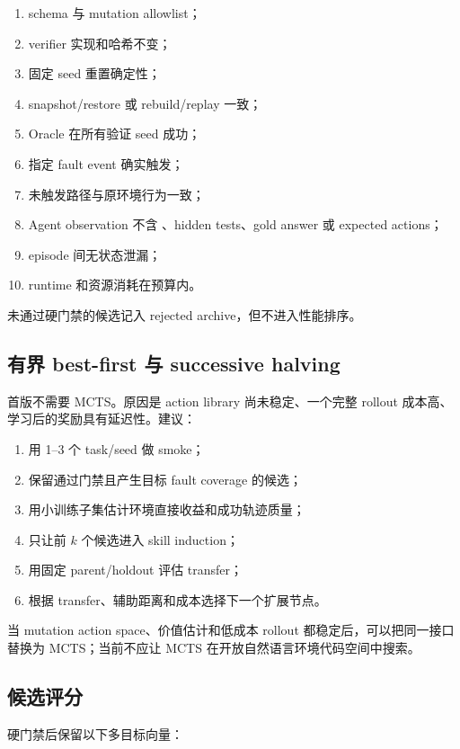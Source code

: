 \documentclass[11pt,a4paper,fontset=fandol]{ctexart}
\newcommand{\code}[1]{\texttt{\detokenize{#1}}}
\begin{document}
\begin{enumerate}
  \item schema 与 mutation allowlist；
  \item verifier 实现和哈希不变；
  \item 固定 seed 重置确定性；
  \item snapshot/restore 或 rebuild/replay 一致；
  \item Oracle 在所有验证 seed 成功；
  \item 指定 fault event 确实触发；
  \item 未触发路径与原环境行为一致；
  \item Agent observation 不含 \code{info}、hidden tests、gold answer 或 expected actions；
  \item episode 间无状态泄漏；
  \item runtime 和资源消耗在预算内。
\end{enumerate}

未通过硬门禁的候选记入 rejected archive，但不进入性能排序。

\subsection{有界 best-first 与 successive halving}

首版不需要 MCTS。原因是 action library 尚未稳定、一个完整 rollout 成本高、学习后的奖励具有延迟性。建议：

\begin{enumerate}
  \item 用 1--3 个 task/seed 做 smoke；
  \item 保留通过门禁且产生目标 fault coverage 的候选；
  \item 用小训练子集估计环境直接收益和成功轨迹质量；
  \item 只让前 $k$ 个候选进入 skill induction；
  \item 用固定 parent/holdout 评估 transfer；
  \item 根据 transfer、辅助距离和成本选择下一个扩展节点。
\end{enumerate}

当 mutation action space、价值估计和低成本 rollout 都稳定后，可以把同一接口替换为 MCTS；当前不应让 MCTS 在开放自然语言环境代码空间中搜索。

\subsection{候选评分}

硬门禁后保留以下多目标向量：
\end{document}
